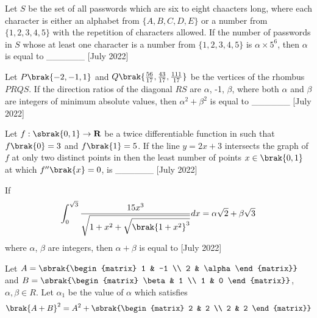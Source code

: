 \iffalse
\title{2022}
\author{AI24BTECH11009}
\section{integer}
\fi
\item Let $S$ be the set of all passwords which are six to eight chaacters long, where each character is either an alphabet from $\{A, B, C, D, E\}$ or a number from $\{1, 2, 3, 4, 5\}$ with the repetition of characters allowed. If the number of passwords in $S$ whose at least one character is a number from $\{1, 2, 3, 4, 5\}$ is $\alpha \times 5^6$, then $\alpha$ is equal to \_\_\_\_\_\_ \hfill[July 2022] \\
\item Let $P\brak{-2, -1, 1}$ and $Q\brak{\frac{56}{17}, \frac{43}{17}, \frac{111}{17}}$ be the vertices of the rhombus $PRQS$. If the direction ratios of the diagonal $RS$ are $\alpha$, -1, $\beta$, where both $\alpha$ and $\beta$ are integers of minimum absolute values, then $\alpha^2 + \beta^2$ is equal to \_\_\_\_\_\_ \hfill[July 2022] \\
\item Let $f:\sbrak{0, 1}\rightarrow\textbf{R}$ be a twice differentiable function in  such that $f\brak{0} = 3$ and $f\brak{1} = 5$. If the line $y = 2x + 3$ intersects the graph of $f$ at only two distinct points in  then the least number of points $x\in\brak{0, 1}$ at which $f''\brak{x} = 0$, is \_\_\_\_\_\_ \hfill[July 2022] \\
\item If 
\begin{align*}
\int_{0}^{\sqrt{3}}\frac{15x^3}{\sqrt{1+x^2+\sqrt{\brak{1+x^2}^3}}}dx= \alpha\sqrt{2} + \beta\sqrt{3}
\end{align*}
where $\alpha$, $\beta$ are integers, then $\alpha+\beta$ is equal to \hfill[July 2022] \\
\item Let $A=\sbrak{\begin{matrix}
    1 & -1 \\ 2 & \alpha
\end{matrix}}$ and $B=\sbrak{\begin{matrix}
    \beta & 1 \\ 1 & 0
\end{matrix}}$, $\alpha, \beta \in R$. Let $\alpha_1$ be the value of $\alpha$ which satisfies 
\begin{align*}
    \brak{A+B}^2 = A^2 + \sbrak{\begin{matrix}
        2 & 2 \\ 2 & 2
    \end{matrix}}
\end{align*}
